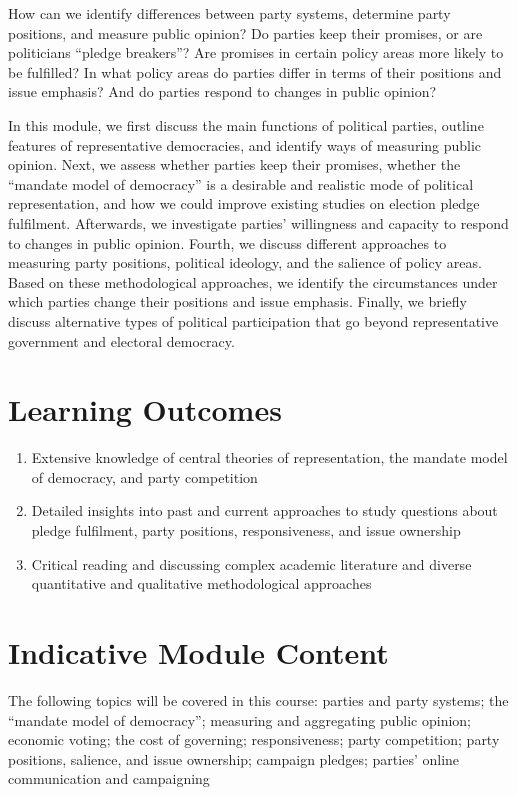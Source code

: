 \documentclass[abstract=on,parskip=full,headings=standardclasses,fontsize=11pt,paper=a4]{scrartcl}
\begin{document}
How can we identify differences between party systems, determine party positions, and measure public opinion? Do parties keep their promises, or are politicians ``pledge breakers''? Are promises in certain policy areas more likely to be fulfilled? In what policy areas do parties differ in terms of their positions and issue emphasis? And do parties respond to changes in public opinion?

In this module, we first discuss the main functions of political parties, outline features of representative democracies, and identify ways of measuring public opinion. Next, we assess whether parties keep their promises, whether the ``mandate model of democracy'' is a desirable and realistic mode of political representation, and how we could improve existing studies on election pledge fulfilment. Afterwards, we investigate parties' willingness and capacity to respond to changes in public opinion. Fourth, we discuss different approaches to measuring party positions, political ideology, and the salience of policy areas. Based on these methodological approaches, we identify the circumstances under which parties change their positions and issue emphasis. Finally, we briefly discuss alternative types of political participation that go beyond representative government and electoral democracy.




\section*{Learning Outcomes}

\begin{enumerate}
\item Extensive knowledge of central theories of representation,  the mandate model of democracy, and party competition
\item Detailed insights into past and current approaches to study questions about pledge fulfilment, party positions, responsiveness, and issue ownership 
\item Critical reading and discussing  complex academic literature and diverse  quantitative and qualitative methodological approaches
\end{enumerate}

\section*{Indicative Module Content}

The following topics will be covered in this course: parties and party systems; the ``mandate model of democracy''; measuring and aggregating public opinion; economic voting; the cost of governing; responsiveness; party competition; party positions, salience, and issue ownership; campaign pledges; parties' online communication and campaigning
\end{document}
